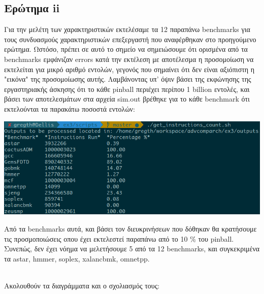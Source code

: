\newpage
\subsection{Ερώτημα ii}

\begin{tcolorbox}
Για την μελέτη των χαρακτηριστικών εκτελέσαμε τα 12 παραπάνω benchmarks για τους
συνδυασμούς χαρακτηριστικών επεξεργαστή που αναφέρθηκαν στο προηγούμενο ερώτημα.
Ωστόσο, πρέπει σε αυτό το σημείο να σημειώσουμε ότι ορισμένα από τα benchmarks
εμφάνιζαν errors κατά την εκτέλεση με αποτέλεσμα η προσομοίωση να εκτελείται για
μικρό αριθμό εντολών, γεγονός που σημαίνει ότι δεν είναι αξιόπιστη η "εικόνα"
της προσομοίωσης αυτής.
Λαμβάνοντας υπ' όψιν βάσει της εκφώνησης της εργαστηριακής άσκησης ότι το κάθε
pinball περιέχει περίπου 1 billion εντολές, και βάσει των αποτελεσμάτων στα
αρχεία sim.out βρέθηκε για το κάθε benchmark ότι εκτελούνται τα παρακάτω ποσοστά
εντολών: 


\begin{center}
   \vspace{3mm}
   \includegraphics[width= \textwidth]{./imgs/count.png}
   \vspace{2mm}
\end{center}

Από τα benchmarks αυτά, και βάσει τον διευκρινήσεων που δόθηκαν θα κρατήσουμε 
τις προσμοποιώσεις οπου έχει εκτελεστεί παραπάνω από το 10 \% του pinball.
Συνεπώς, δεν έχει νόημα να μελετήσουμε 5 από τα 12 benchmarks,
και συγκεκριμένα τα astar, hmmer, soplex, xalancbmk, omnetpp.

\end{tcolorbox}

\noindent \\Ακολουθούν τα διαγράμματα και ο σχολιασμός τους:

